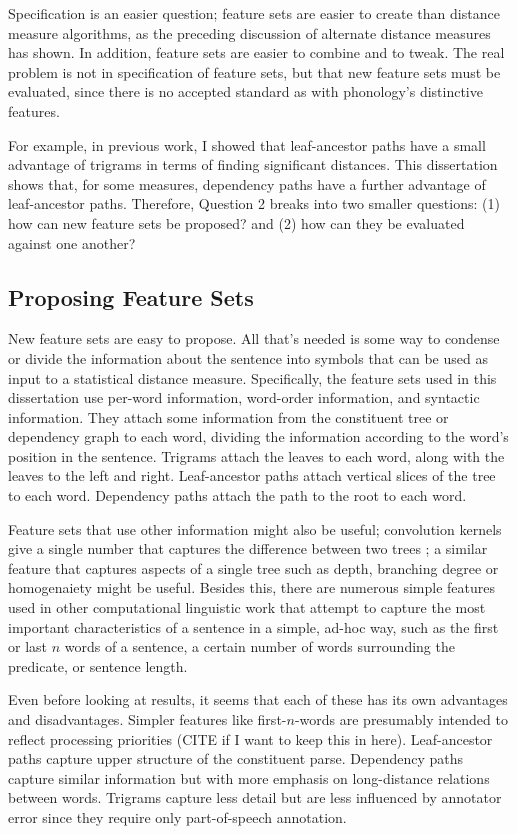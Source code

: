 Specification is an easier question; feature sets are easier
to create than distance measure algorithms, as the preceding
discussion of alternate distance measures has shown. In addition,
feature sets are easier to combine and to tweak. The real problem is
not in specification of feature sets, but that new feature sets must
be evaluated, since there is no accepted standard as with phonology's
distinctive features.

For example, in previous work, I showed that leaf-ancestor paths have a small
advantage of trigrams \cite{sanders07} in terms of finding significant
distances. This dissertation shows that, for some measures, dependency
paths have a further advantage of leaf-ancestor paths. Therefore,
Question 2 breaks into two smaller questions: (1) how can new feature sets
be proposed? and (2) how can they be evaluated against one another?

\subsection{Proposing Feature Sets}

New feature sets are easy to propose. All that's needed is some way to
condense or divide the information about the sentence into symbols
that can be used as input to a statistical distance
measure. Specifically, the feature sets used in this dissertation use
per-word information, word-order information, and syntactic
information. They attach some information from the constituent tree or
dependency graph to each word, dividing the information according to
the word's position in the sentence. Trigrams attach the leaves to
each word, along with the leaves to the left and right.
Leaf-ancestor paths attach vertical slices of the tree to each
word. Dependency paths attach the path to the root to each word.

Feature sets that use other information might also be useful;
convolution kernels give a single number that captures the difference
between two trees \cite{collins01}; a similar feature that captures
aspects of a single tree such as depth, branching degree or
homogenaiety might be useful. Besides this, there are numerous simple
features used in other computational linguistic work that attempt to
capture the most important characteristics of a sentence in a simple,
ad-hoc way, such as the first or last $n$ words of a sentence, a
certain number of words surrounding the predicate, or sentence length.

Even before looking at results, it seems that each of these has its
own advantages and disadvantages. Simpler features like
first-$n$-words are presumably intended to reflect
processing priorities (CITE if I want to keep this in
here). Leaf-ancestor paths capture upper structure of the constituent
parse. Dependency paths capture similar information but with more
emphasis on long-distance relations between words. Trigrams capture
less detail but are less influenced by annotator error since they
require only part-of-speech annotation.

